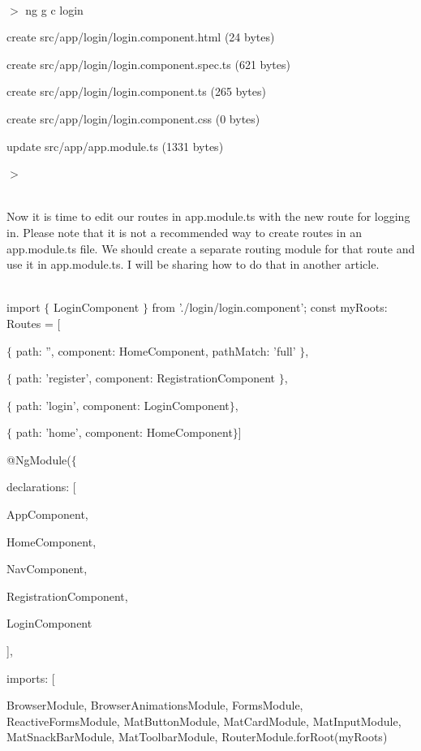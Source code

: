 \documentclass{article}
\begin{document}
\noindent \\ $\mathrm{>}$ ng g c login

\noindent create src/app/login/login.component.html (24 bytes) 

\noindent create src/app/login/login.component.spec.ts (621 bytes) 

\noindent create src/app/login/login.component.ts (265 bytes) 

\noindent create src/app/login/login.component.css (0 bytes) 

\noindent update src/app/app.module.ts (1331 bytes)

\noindent $\mathrm{>}$

\noindent \\ Now it is time to edit our routes in app.module.ts with the new route for logging in. Please note that it is not a recommended way to create routes in an app.module.ts file. We should create a separate routing module for that route and use it in app.module.ts. I will be sharing how to do that in another article.

\noindent \\ import $\mathrm{\{}$ LoginComponent $\mathrm{\}}$ from './login/login.component'; const myRoots: Routes = [

\noindent $\mathrm{\{}$ path: '', component: HomeComponent, pathMatch: 'full' $\mathrm{\}}$,

\noindent $\mathrm{\{}$ path: 'register', component: RegistrationComponent $\mathrm{\}}$,

\noindent $\mathrm{\{}$ path: 'login', component: LoginComponent$\mathrm{\}}$,

\noindent $\mathrm{\{}$ path: 'home', component: HomeComponent$\mathrm{\}}$]

\noindent @NgModule($\mathrm{\{}$

\noindent declarations: [ 

\noindent AppComponent, 

\noindent HomeComponent, 

\noindent NavComponent, 

\noindent RegistrationComponent, 

\noindent LoginComponent

\noindent ],

\noindent 

\noindent imports: [

\noindent BrowserModule, BrowserAnimationsModule, FormsModule, ReactiveFormsModule, MatButtonModule, MatCardModule, MatInputModule, MatSnackBarModule, MatToolbarModule, RouterModule.forRoot(myRoots)
\end{document}
